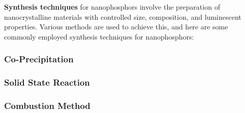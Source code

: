 \documentclass[../synthesisAndCharacter.tex]{subfiles}
\begin{document}
    \textbf{Synthesis techniques} for nanophosphors involve the preparation of nanocrystalline materials with controlled size, 
    composition, and luminescent properties. Various methods are used to achieve this, and here are some commonly 
    employed synthesis techniques for nanophosphors:

    \subsubsection{Co-Precipitation}
        
    
    \subsubsection{Solid State Reaction}
        

    \subsubsection{Combustion Method}
        
\end{document}

